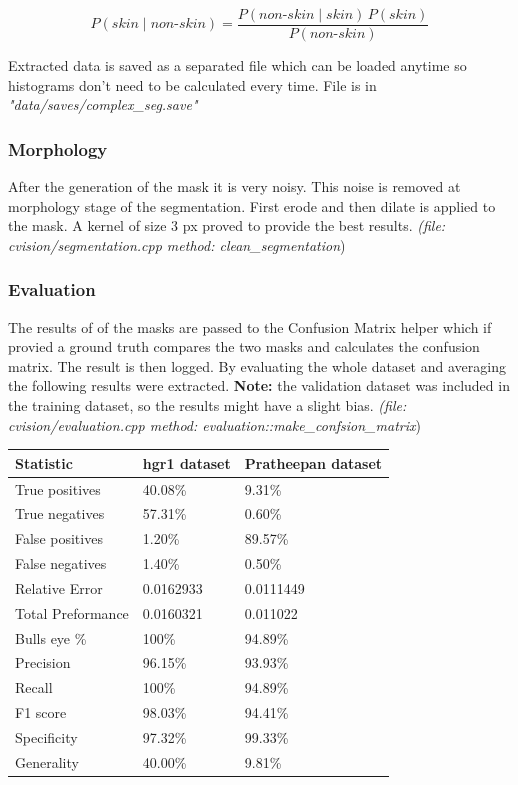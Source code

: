 \documentclass[11pt,a4paper]{article}
\begin{document}
\newcommand{\nonskin}{\ensuremath{\textit{non-skin}}}%
\begin{equation}
P(skin \mid \nonskin) = \frac{P(\nonskin \mid skin) \, P(skin)}{P(\nonskin)}
\label{bayes}
\end{equation}

Extracted data is saved as a separated file which can be loaded anytime so histograms don't need to be calculated every time. File is in \textit{"data/saves/complex\_seg.save"}

\subsubsection{Morphology}
After the generation of the mask it is very noisy. This noise is removed at morphology stage of the segmentation. First erode and then dilate is applied to the mask. A kernel of size 3 px proved to provide the best results. \textit{(file: cvision/segmentation.cpp method: clean\_segmentation})

\subsubsection{Evaluation}
The results of of the masks are passed to the Confusion Matrix helper which if provied a ground truth compares the two masks and calculates the confusion matrix. The result is then logged. By evaluating the whole dataset and averaging the following results were extracted. \textbf{Note:} the validation dataset was included in the training dataset, so the results might have a slight bias. \textit{(file: cvision/evaluation.cpp method: evaluation::make\_confsion\_matrix})

\begin{center}
\begin{tabular}{ |l|l|l| }
\hline
Statistic & hgr1 dataset & Pratheepan dataset \\ 
\hline
True positives & 40.08\% & 9.31\% \\ 
True negatives & 57.31\% & 0.60\% \\ 
False positives & 1.20\% & 89.57\% \\
False negatives & 1.40\% & 0.50\% \\
Relative Error & 0.0162933 & 0.0111449 \\
Total Preformance & 0.0160321 & 0.011022 \\
Bulls eye \% & 100\% & 94.89\% \\
Precision & 96.15\% & 93.93\% \\
Recall & 100\% & 94.89\% \\
F1 score & 98.03\% & 94.41\% \\
Specificity & 97.32\% & 99.33\% \\
Generality & 40.00\% & 9.81\% \\
\hline
\end{tabular}
\end{center}
\end{document}
